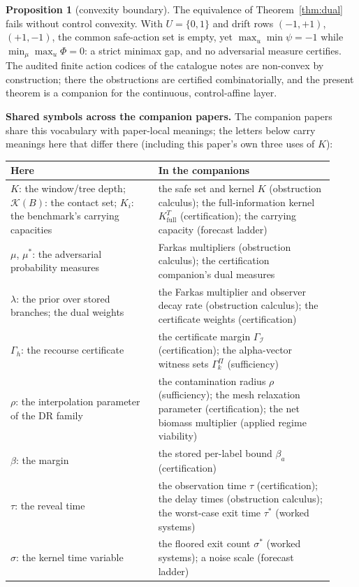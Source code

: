 \documentclass[10pt,twocolumn]{article}
\theoremstyle{definition}
\newtheorem{proposition}{Proposition}
\begin{document}
\begin{proposition}[convexity boundary]\label{prop:gap}
The equivalence of Theorem~\ref{thm:dual} fails without control
convexity. With $U = \{0,1\}$ and drift rows
$(-1,+1)$, $(+1,-1)$, the common safe-action set is empty, yet
$\max_{u}\min\psi = -1$ while $\min_{\mu}\max_{u}\Phi = 0$: a strict
minimax gap, and no adversarial measure certifies. The audited finite
action codices of the catalogue notes are non-convex by construction;
there the obstructions are certified combinatorially, and the present
theorem is a companion for the continuous, control-affine layer.
\end{proposition}

\medskip
\noindent\textbf{Shared symbols across the companion papers.} The
companion papers share this vocabulary with paper-local meanings; the
letters below carry meanings here that differ there (including this
paper's own three uses of $K$):
\begin{center}\small
\begin{tabular}{@{}p{0.42\linewidth}p{0.50\linewidth}@{}}
\toprule
\textbf{Here} & \textbf{In the companions} \\
\midrule
$K$: the window/tree depth; $\mathcal{K}(B)$: the contact set; $K_{i}$: the benchmark's carrying capacities & the safe set and kernel $K$ (obstruction calculus); the full-information kernel $K^{T}_{\mathrm{full}}$ (certification); the carrying capacity (forecast ladder) \\
$\mu$, $\mu^{*}$: the adversarial probability measures & Farkas multipliers (obstruction calculus); the certification companion's dual measures \\
$\lambda$: the prior over stored branches; the dual weights & the Farkas multiplier and observer decay rate (obstruction calculus); the certificate weights (certification) \\
$\Gamma_{h}$: the recourse certificate & the certificate margin $\Gamma_{\mathcal{I}}$ (certification); the alpha-vector witness sets $\Gamma^{\Pi}_{k}$ (sufficiency) \\
$\rho$: the interpolation parameter of the DR family & the contamination radius $\rho$ (sufficiency); the mesh relaxation parameter (certification); the net biomass multiplier (applied regime viability) \\
$\beta$: the margin & the stored per-label bound $\beta_{a}$ (certification) \\
$\tau$: the reveal time & the observation time $\tau$ (certification); the delay times (obstruction calculus); the worst-case exit time $\tau^{*}$ (worked systems) \\
$\sigma$: the kernel time variable & the floored exit count $\sigma^{*}$ (worked systems); a noise scale (forecast ladder) \\
\bottomrule
\end{tabular}
\end{center}
\end{document}
